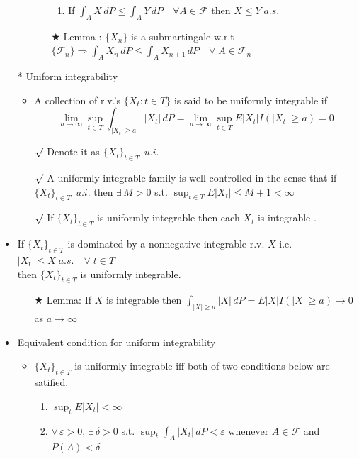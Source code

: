 \documentclass[12pt, A4]{article}
\newcommand{\rmk}{$\surd$}
\newcommand{\trick}{$\bigstar$}
\newcommand{\F}{\mathcal{F}}
\newcommand{\exist}{\exists\,}
\begin{document}
\begin{itemize}
\begin{itemize}
\begin{itemize}
\begin{enumerate}
				\item If $\int_A X\, dP \leq \int_A Y \, dP\quad \forall A\in \F$ then $X\leq Y\; a.s.$ 
			\end{enumerate}
			\item[\trick] Lemma : $\{X_n\}$ is a submartingale w.r.t $\{\F_n\} \Rightarrow \int_A X_n\, dP \leq \int_A X_{n+1}\, dP\quad \forall\; A\in \F_n$
		\end{itemize} 
	\end{itemize}
	\item[*] Uniform integrability
	\begin{itemize}
		\item A collection of r.v.'s $\{X_t : t\in T\}$ is said to be uniformly integrable if 
		$$
			\lim_{a\rightarrow \infty} \sup_{t\in T} \int_{|X_t|\geq a}|X_t|\,dP = \lim_{a\rightarrow \infty} \sup_{t\in T} E|X_t|I(|X_t|\geq a) =0
		$$
		\item[\rmk] Denote it as $\{X_t\}_{t\in T}\;\,u.i.$
		\item[\rmk] A uniformly integrable family is well-controlled in the sense that if $\{X_t\}_{t\in T}\;\,u.i.$ then $\exist M>0$ s.t. $\sup_{t\in T}E|X_t|\leq M+1<\infty$
		\item[\rmk] If $\{X_t\}_{t\in T}$ is uniformly integrable then each $X_t$ is integrable .
	\end{itemize}
	\item If $\{X_t\}_{t\in T}$ is dominated by a nonnegative integrable r.v. $X$ \;i.e. $|X_t|\leq X\;a.s.\quad \forall\;t\in T$ \\ then $\{X_t\}_{t\in T}$ is uniformly integrable.
	\begin{itemize}
		\item[\trick] Lemma: If $X$ is integrable then $\int_{|X|\geq a} |X|\,dP=E|X|I(|X|\geq a)\rightarrow 0$ as $a\rightarrow \infty$
	\end{itemize}
	\item Equivalent condition for uniform integrability
	\begin{itemize}
		\item $\{X_t\}_{t\in T}$ is uniformly integrable iff both of two conditions below are satified. 
		\begin{enumerate}
			\item $\sup_t E|X_t|<\infty$
			\item $\forall \, \varepsilon>0,\, \exist \delta>0$  s.t. $\sup_t\int_A|X_t|\, dP<\varepsilon$ whenever $A\in \F$ and $P(A)<\delta$
		\end{enumerate}
	\end{itemize}

\end{itemize}
\end{document}
